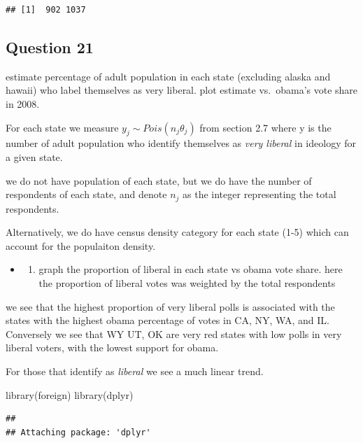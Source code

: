 \documentclass[
]{book}
\newenvironment{Shaded}{\begin{snugshade}}{\end{snugshade}}
\newcommand{\FunctionTok}[1]{\textcolor[rgb]{0.00,0.00,0.00}{#1}}
\newcommand{\NormalTok}[1]{#1}
\providecommand{\tightlist}{%
  \setlength{\itemsep}{0pt}\setlength{\parskip}{0pt}}
\theoremstyle{definition}
\theoremstyle{definition}
\theoremstyle{definition}
\theoremstyle{definition}
\theoremstyle{remark}
\begin{document}
\begin{verbatim}
## [1]  902 1037
\end{verbatim}

\hypertarget{question-21}{%
\subsection{Question 21}\label{question-21}}

estimate percentage of adult population in each state (excluding alaska and hawaii) who label themselves as very liberal. plot estimate vs.~obama's vote share in 2008.

For each state we measure \(y_j\sim Pois(n_j\theta_j)\) from section 2.7 where y is the number of adult population who identify themselves as \emph{very liberal} in ideology for a given state.

we do not have population of each state, but we do have the number of respondents of each state, and denote \(n_j\) as the integer representing the total respondents.

Alternatively, we do have census density category for each state (1-5) which can account for the populaiton density.

\begin{itemize}
\item
  \begin{enumerate}
  \def\labelenumi{(\alph{enumi})}
  \tightlist
  \item
    graph the proportion of liberal in each state vs obama vote share. here the proportion of liberal votes was weighted by the total respondents
  \end{enumerate}
\end{itemize}

we see that the highest proportion of very liberal polls is associated with the states with the highest obama percentage of votes in CA, NY, WA, and IL. Conversely we see that WY UT, OK are very red states with low polls in very liberal voters, with the lowest support for obama.

For those that identify as \emph{liberal} we see a much linear trend.

\begin{Shaded}
\begin{Highlighting}[]
 \FunctionTok{library}\NormalTok{(foreign)}
 \FunctionTok{library}\NormalTok{(dplyr)}
\end{Highlighting}
\end{Shaded}

\begin{verbatim}
## 
## Attaching package: 'dplyr'
\end{verbatim}
\end{document}
